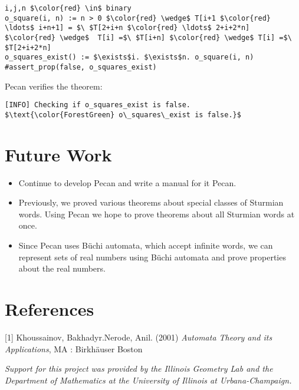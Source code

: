 \documentclass[landscape,usenames,dvipsnames]{sciposter}
\begin{document}
\begin{multicols}{3}
\begin{lstlisting}[language=pecan, basicstyle=\normalsize\ttfamily, mathescape=true, frame=single]
i,j,n $\color{red} \in$ binary
o_square(i, n) := n > 0 $\color{red} \wedge$ T[i+1 $\color{red} \ldots$ i+n+1] = $\ $T[2+i+n $\color{red} \ldots$ 2+i+2*n] $\color{red} \wedge$  T[i] =$\ $T[i+n] $\color{red} \wedge$ T[i] =$\ $T[2+i+2*n]
o_squares_exist() := $\exists$i. $\exists$n. o_square(i, n)
#assert_prop(false, o_squares_exist)
\end{lstlisting}
Pecan verifies the theorem: 
\begin{lstlisting}[basicstyle=\normalsize\ttfamily, mathescape=true, frame=single]
[INFO] Checking if o_squares_exist is false.
$\text{\color{ForestGreen} o\_squares\_exist is false.}$
\end{lstlisting}

\section*{Future Work}

\begin{itemize}
\item Continue to develop Pecan and write a manual for it Pecan. 
\item Previously, we proved various theorems about special classes of Sturmian words. Using Pecan we hope to prove theorems about all Sturmian words at once.
\item Since Pecan uses B\"uchi automata, which accept infinite words, we can represent sets of real numbers using B\"uchi automata and prove properties about the real numbers.
\end{itemize}

\vspace*{-10pt}  %
\section*{References}

{\footnotesize [1] Khoussainov, Bakhadyr.Nerode, Anil. (2001) \emph{Automata Theory and its Applications}, MA : Birkh\"auser Boston
}



\vspace*{10mm} %
\emph{
Support for this project was provided by the Illinois Geometry Lab and the Department of Mathematics at the University of Illinois at Urbana-Champaign.
}
\end{multicols}
\end{document}
